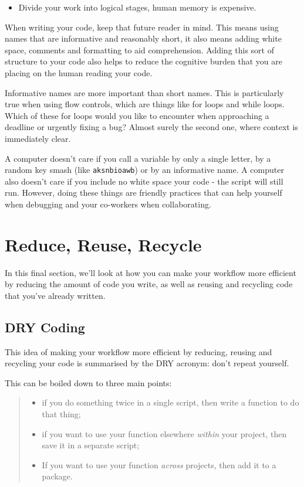 \documentclass[
  letterpaper,
  DIV=11,
  numbers=noendperiod]{scrreprt}
\providecommand{\tightlist}{%
  \setlength{\itemsep}{0pt}\setlength{\parskip}{0pt}}\usepackage{longtable,booktabs,array}
\begin{document}
\begin{itemize}
\tightlist
\item
  Divide your work into logical stages, human memory is expensive.
\end{itemize}

When writing your code, keep that future reader in mind. This means
using names that are informative and reasonably short, it also means
adding white space, comments and formatting to aid comprehension. Adding
this sort of structure to your code also helps to reduce the cognitive
burden that you are placing on the human reading your code.

Informative names are more important than short names. This is
particularly true when using flow controls, which are things like for
loops and while loops. Which of these for loops would you like to
encounter when approaching a deadline or urgently fixing a bug? Almost
surely the second one, where context is immediately clear.

A computer doesn't care if you call a variable by only a single letter,
by a random key smash (like \texttt{aksnbioawb}) or by an informative
name. A computer also doesn't care if you include no white space your
code - the script will still run. However, doing these things are
friendly practices that can help yourself when debugging and your
co-workers when collaborating.

\section{Reduce, Reuse, Recycle}\label{reduce-reuse-recycle}

In this final section, we'll look at how you can make your workflow more
efficient by reducing the amount of code you write, as well as reusing
and recycling code that you've already written.

\subsection{DRY Coding}\label{dry-coding}

This idea of making your workflow more efficient by reducing, reusing
and recycling your code is summarised by the DRY acronym: don't repeat
yourself.

This can be boiled down to three main points:

\begin{quote}
\begin{itemize}
\tightlist
\item
  if you do something twice in a single script, then write a function to
  do that thing;
\item
  if you want to use your function elsewhere \emph{within} your project,
  then save it in a separate script;
\item
  If you want to use your function \emph{across} projects, then add it
  to a package.
\end{itemize}
\end{quote}
\end{document}
